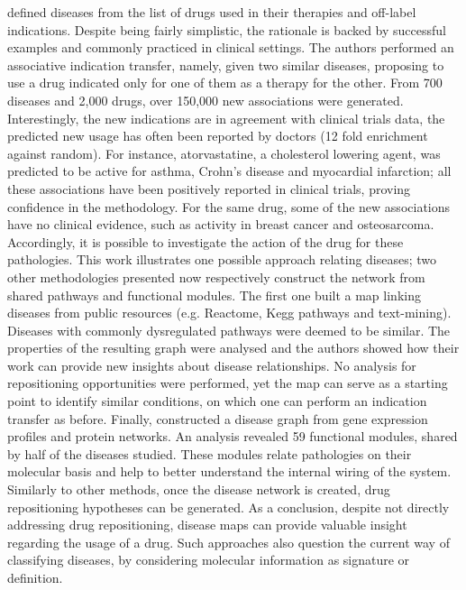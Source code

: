 \cite{chiang2009systematic} defined diseases from the list of drugs used in their therapies and off-label indications. Despite being fairly simplistic, the rationale is backed by successful examples and commonly practiced in clinical settings. The authors performed an associative indication transfer, namely, given two similar diseases, proposing to use a drug indicated only for one of them as a therapy for the other. From 700 diseases and 2,000 drugs, over 150,000 new associations were generated. Interestingly, the new indications are in agreement with clinical trials data, the predicted new usage has often been reported by doctors (12 fold enrichment against random). For instance, atorvastatine, a cholesterol lowering agent, was predicted to be active for asthma, Crohn's disease and myocardial infarction; all these associations have been positively reported in clinical trials, proving confidence in the methodology. For the same drug, some of the new associations have no clinical evidence, such as activity in breast cancer and osteosarcoma. Accordingly, it is possible to investigate the action of the drug for these pathologies. This work illustrates one possible approach relating diseases; two other methodologies presented now respectively construct the network from shared pathways and functional modules.
The first one \citep{li2009pathway} built a map linking diseases from public resources (e.g. Reactome, Kegg pathways and text-mining). Diseases with commonly dysregulated pathways were deemed to be similar. The properties of the resulting graph were analysed and the authors showed how their work can provide new insights about disease relationships. No analysis for repositioning opportunities were performed, yet the map can serve as a starting point to identify similar conditions, on which one can perform an indication transfer as before.
Finally, \cite{suthram2010network} constructed a disease graph from gene expression profiles and protein networks. An analysis revealed 59 functional modules, shared by half of the diseases studied. These modules relate pathologies on their molecular basis and help to better understand the internal wiring of the system. Similarly to other methods, once the disease network is created, drug repositioning hypotheses can be generated.
As a conclusion, despite not directly addressing drug repositioning, disease maps can provide valuable insight regarding the usage of a drug. Such approaches also question the current way of classifying diseases, by considering molecular information as signature or definition.

